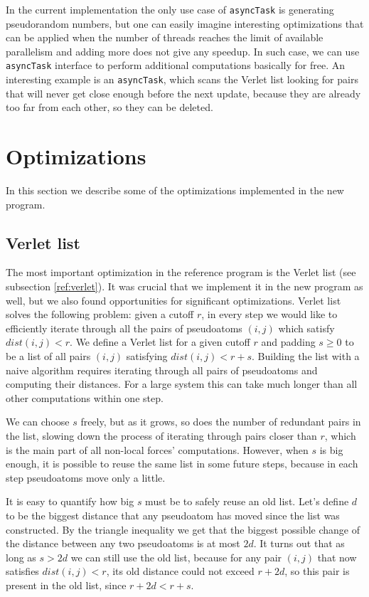 In the current implementation the only use case of \texttt{asyncTask} is generating pseudorandom numbers, but one can easily imagine interesting optimizations that can be applied when the number of threads reaches the limit of available parallelism and adding more does not give any speedup. In such case, we can use \texttt{asyncTask} interface to perform additional computations basically for free. An interesting example is an \texttt{asyncTask}, which scans the Verlet list looking for pairs that will never get close enough before the next update, because they are already too far from each other, so they can be deleted.

\section{Optimizations}\label{new:opt}

In this section we describe some of the optimizations implemented in the new program.

\subsection{Verlet list}\label{opt:verlet}

The most important optimization in the reference program is the Verlet list (see subsection \ref{ref:verlet}). It was crucial that we implement it in the new program as well, but we also found opportunities for significant optimizations. Verlet list solves the following problem: given a cutoff $r$, in every step we would like to efficiently iterate through all the pairs of pseudoatoms $(i, j)$ which satisfy $dist(i, j) < r$. We define a Verlet list for a given cutoff $r$ and padding $s \geq 0$ to be a list of all pairs $(i, j)$ satisfying $dist(i, j) < r + s$. Building the list with a naive algorithm requires iterating through all pairs of pseudoatoms and computing their distances. For a large system this can take much longer than all other computations within one step. 

We can choose $s$ freely, but as it grows, so does the number of redundant pairs in the list, slowing down the process of iterating through pairs closer than $r$, which is the main part of all non-local forces' computations. However, when $s$ is big enough, it is possible to reuse the same list in some future steps, because in each step pseudoatoms move only a little. 

It is easy to quantify how big $s$ must be to safely reuse an old list. Let's define $d$ to be the biggest distance that any pseudoatom has moved since the list was constructed. By the triangle inequality we get that the biggest possible change of the distance between any two pseudoatoms is at most $2d$. It turns out that as long as $s > 2d$ we can still use the old list, because for any pair $(i, j)$ that now satisfies $dist(i, j) < r$, its old distance could not exceed $r + 2d$, so this pair is present in the old list, since $r + 2d < r + s$. 

